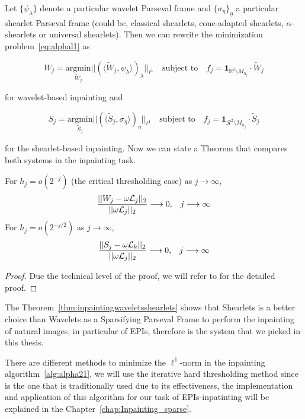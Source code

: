 Let $\{\psi_{\lambda}\}$ denote a particular wavelet Parseval frame and $\{ \sigma_{\eta}\}_{\eta}$ a particular shearlet Parseval frame (could be, classical shearlets, cone-adapted shearlets, $\alpha$-shearlets or universal shearlets). Then we can rewrite the minimization problem~\ref{eq:alphal1} as

$$
W_j=\underset{\tilde{W}_j}{\textrm{argmin}}||(\langle \tilde{W}_j,\psi_{\lambda}\rangle )_{\lambda}||_{\ell^1}\quad\textrm{subject to}\quad f_j=\mathbf{1}_{\mathbb{R}^2\setminus M_{h_j}}\cdot\tilde{W}_j
$$ 

for wavelet-based inpainting and 

$$
S_j=\underset{\tilde{S}_j}{\textrm{argmin}}||(\langle \tilde{S}_j,\sigma_{\eta}\rangle)_{\eta}||_{\ell^1}\quad \textrm{subject to}\quad f_j=\mathbf{1}_{\mathcal{R}^2\setminus M_{h_j}}\cdot\tilde{S}_j
$$

for the shearlet-based inpainting. Now we can state a Theorem that compares both systems in the inpainting task.

\begin{thm}
\label{thm:inpaintingwaveletsshearlets}
For $h_j=o(2^{-j})$ (the critical thresholding case) as $j\longrightarrow \infty$,
$$
\frac{||W_j-\omega\mathcal{L}_j||_2}{||\omega\mathcal{L}_j||_2}\longrightarrow 0\textrm{,}\quad j\longrightarrow \infty\\
$$ 
For $h_j=o(2^{-j/2})$ as $j\longrightarrow\infty$,
$$
\frac{||S_j-\omega\mathcal{L}_k||_2}{||\omega\mathcal{L}_j||_2}\longrightarrow 0\textrm{,}\quad j\longrightarrow\infty\\
$$
\end{thm}
\begin{proof}
Due the technical level of the proof, we will refer to \cite{clustered-inpainting} for the detailed proof. 
\end{proof}

The Theorem~\ref{thm:inpaintingwaveletsshearlets} shows that Shearlets is a better choice than Wavelets as a Sparsifying  Parseval Frame to perform the inpainting of natural images, in particular of EPIs, therefore is the system that we picked in this thesis.

\bigskip

There are different methods to minimize the $\ell^1$-norm in the inpainting algorithm~\ref{alg:alpha21}, we will use the iterative hard thresholding method since is the one that is traditionally used due to its effectiveness, the implementation and application of this algorithm for our task of EPIs-inpatinting will be explained in the Chapter~\ref{chap:Inpainting_sparse}.

